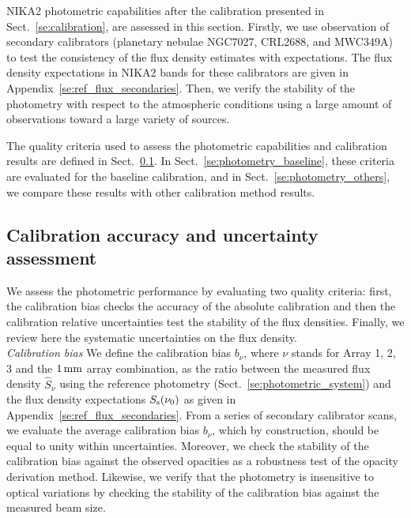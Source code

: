 %

NIKA2 photometric capabilities after the calibration presented in
Sect.~\ref{se:calibration}, are assessed in this section. Firstly,
we use observation of secondary calibrators (planetary nebulae NGC7027, CRL2688, and
MWC349A) to test the consistency of the flux density estimates with
expectations. The flux density expectations
in NIKA2 bands for these calibrators are given in
Appendix~\ref{se:ref_flux_secondaries}. Then,
we verify the stability of the photometry with
respect to the atmospheric conditions using a large amount of
observations toward a large variety of sources. 

The quality criteria used to assess the photometric
capabilities and calibration results are defined in
Sect.~\ref{se:photometry_criteria}.
In Sect.~\ref{se:photometry_baseline}, these criteria are evaluated
for the baseline calibration, and in Sect.~\ref{se:photometry_others},
we compare these results with other calibration method results. 


\subsection{Calibration accuracy and uncertainty assessment}
\label{se:photometry_criteria}

We assess the photometric performance by evaluating two
quality criteria: first, the calibration bias checks the accuracy of
the absolute calibration and then the calibration relative
uncertainties test the stability of the flux densities. {\lp Finally,
we review here the systematic uncertainties on the flux density.} \\

\noindent \emph{Calibration bias} We define the calibration bias
$b_{\nu}$, where $\nu$ stands for Array 1, 2, 3 and the
$1\,\rm{mm}$ array combination, as
the ratio between the measured flux density $\hat{S}_{\nu}$ using the
reference photometry
(Sect.~\ref{se:photometric_system}) and the flux density
expectations $S_{\rm{s}}(\nu_0)$ as given in
Appendix~\ref{se:ref_flux_secondaries}. From a series of
secondary calibrator scans, we evaluate the average calibration bias
$b_{\nu}$, which by construction, should be equal to
unity within uncertainties.
Moreover, we check the stability of the calibration bias against
the observed opacities as a robustness test of the
opacity derivation method. Likewise, we verify that the photometry is
insensitive to optical variations by checking the stability of the
calibration bias against the measured beam size.\\

